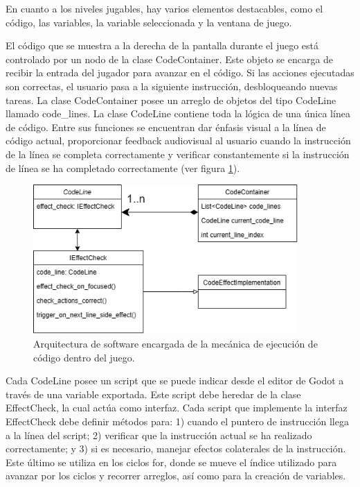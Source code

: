 En cuanto a los niveles jugables, hay varios elementos destacables, como el código, las variables, la variable seleccionada y la ventana de juego.

El código que se muestra a la derecha de la pantalla durante el juego está controlado por un nodo de la clase CodeContainer. Este objeto se encarga de recibir la entrada del jugador para avanzar en el código. Si las acciones ejecutadas son correctas, el usuario pasa a la siguiente instrucción, desbloqueando nuevas tareas. La clase CodeContainer posee un arreglo de objetos del tipo CodeLine llamado code\_lines. La clase CodeLine contiene toda la lógica de una única línea de código. Entre sus funciones se encuentran dar énfasis visual a la línea de código actual, proporcionar feedback audiovisual al usuario cuando la instrucción de la línea se completa correctamente y verificar constantemente si la instrucción de línea se ha completado correctamente (ver figura \ref{CodeLinesArchitecture}).

\begin{figure}[h]
	\centering
	\includegraphics[width=0.9\textwidth]{imagenes/code_lines_architecture.png}
	\caption{Arquitectura de software encargada de la mecánica de ejecución de código dentro del juego.}
	\label{CodeLinesArchitecture}
\end{figure}

Cada CodeLine posee un script que se puede indicar desde el editor de Godot a través de una variable exportada. Este script debe heredar de la clase EffectCheck, la cual actúa como interfaz. Cada script que implemente la interfaz EffectCheck debe definir métodos para: 1) cuando el puntero de instrucción llega a la línea del script; 2) verificar que la instrucción actual se ha realizado correctamente; y 3) si es necesario, manejar efectos colaterales de la instrucción. Este último se utiliza en los ciclos for, donde se mueve el índice utilizado para avanzar por los ciclos y recorrer arreglos, así como para la creación de variables.

